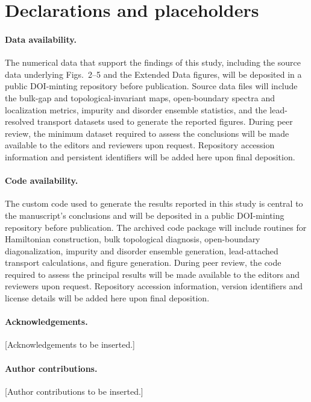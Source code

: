 \documentclass[11pt]{article}
\begin{document}
\section*{Declarations and placeholders}

\paragraph{Data availability.}
The numerical data that support the findings of this study, including the source data underlying Figs.~2--5 and the Extended Data figures, will be deposited in a public DOI-minting repository before publication. Source data files will include the bulk-gap and topological-invariant maps, open-boundary spectra and localization metrics, impurity and disorder ensemble statistics, and the lead-resolved transport datasets used to generate the reported figures. During peer review, the minimum dataset required to assess the conclusions will be made available to the editors and reviewers upon request. Repository accession information and persistent identifiers will be added here upon final deposition.

\paragraph{Code availability.}
The custom code used to generate the results reported in this study is central to the manuscript's conclusions and will be deposited in a public DOI-minting repository before publication. The archived code package will include routines for Hamiltonian construction, bulk topological diagnosis, open-boundary diagonalization, impurity and disorder ensemble generation, lead-attached transport calculations, and figure generation. During peer review, the code required to assess the principal results will be made available to the editors and reviewers upon request. Repository accession information, version identifiers and license details will be added here upon final deposition.

\paragraph{Acknowledgements.}
[Acknowledgements to be inserted.]

\paragraph{Author contributions.}
[Author contributions to be inserted.]
\end{document}
